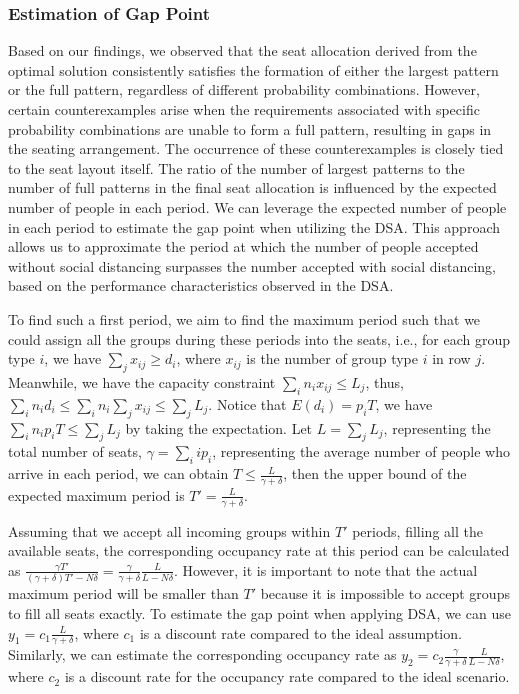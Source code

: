 \subsubsection{Estimation of Gap Point}
Based on our findings, we observed that the seat allocation derived from the optimal solution consistently satisfies the formation of either the largest pattern or the full pattern, regardless of different probability combinations. However, certain counterexamples arise when the requirements associated with specific probability combinations are unable to form a full pattern, resulting in gaps in the seating arrangement. The occurrence of these counterexamples is closely tied to the seat layout itself. The ratio of the number of largest patterns to the number of full patterns in the final seat allocation is influenced by the expected number of people in each period. We can leverage the expected number of people in each period to estimate the gap point when utilizing the DSA. This approach allows us to approximate the period at which the number of people accepted without social distancing surpasses the number accepted with social distancing, based on the performance characteristics observed in the DSA.

To find such a first period, we aim to find the maximum period such that we could assign all the groups during these periods into the seats, i.e., for each group type $i$, we have $\sum_{j} x_{ij} \geq d_i$, where $x_{ij}$ is the number of group type $i$ in row $j$. Meanwhile, we have the capacity constraint $\sum_{i} n_{i} x_{ij} \leq L_j$, thus, $\sum_{i} n_i d_i \leq \sum_{i} n_i \sum_{j} x_{ij} \leq \sum_{j} L_{j}$. Notice that $E(d_i) = p_i T$, we have $\sum_{i} n_i p_i T \leq \sum_{j} L_{j}$ by taking the expectation. Let $L = \sum_{j} L_{j}$, representing the total number of seats, $\gamma = \sum_{i} i p_i$, representing the average number of people who arrive in each period, we can obtain $T \leq \frac{L}{\gamma + \delta}$, then the upper bound of the expected maximum period is $T' = \frac{L}{\gamma + \delta}$.


Assuming that we accept all incoming groups within $T'$ periods, filling all the available seats, the corresponding occupancy rate at this period can be calculated as $\frac{\gamma T'}{(\gamma+ \delta)T' - N \delta} = \frac{\gamma}{\gamma +\delta} \frac{L}{L-N \delta}$. However, it is important to note that the actual maximum period will be smaller than $T{'}$ because it is impossible to accept groups to fill all seats exactly. To estimate the gap point when applying DSA, we can use $y_1 = c_1 \frac{L}{\gamma + \delta}$, where $c_1$ is a discount rate compared to the ideal assumption. Similarly, we can estimate the corresponding occupancy rate as $y_2 = c_2 \frac{\gamma}{\gamma +\delta} \frac{L}{L-N \delta}$, where $c_2$ is a discount rate for the occupancy rate compared to the ideal scenario.


